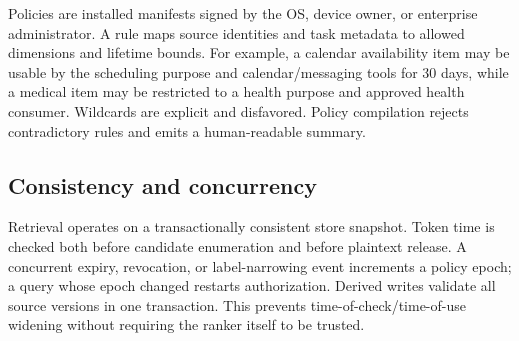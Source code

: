 Policies are installed manifests signed by the OS, device owner, or enterprise administrator. A rule maps source identities and task metadata to allowed dimensions and lifetime bounds. For example, a calendar availability item may be usable by the scheduling purpose and calendar/messaging tools for 30 days, while a medical item may be restricted to a health purpose and approved health consumer. Wildcards are explicit and disfavored. Policy compilation rejects contradictory rules and emits a human-readable summary.

\subsection{Consistency and concurrency}

Retrieval operates on a transactionally consistent store snapshot. Token time is checked both before candidate enumeration and before plaintext release. A concurrent expiry, revocation, or label-narrowing event increments a policy epoch; a query whose epoch changed restarts authorization. Derived writes validate all source versions in one transaction. This prevents time-of-check/time-of-use widening without requiring the ranker itself to be trusted.
